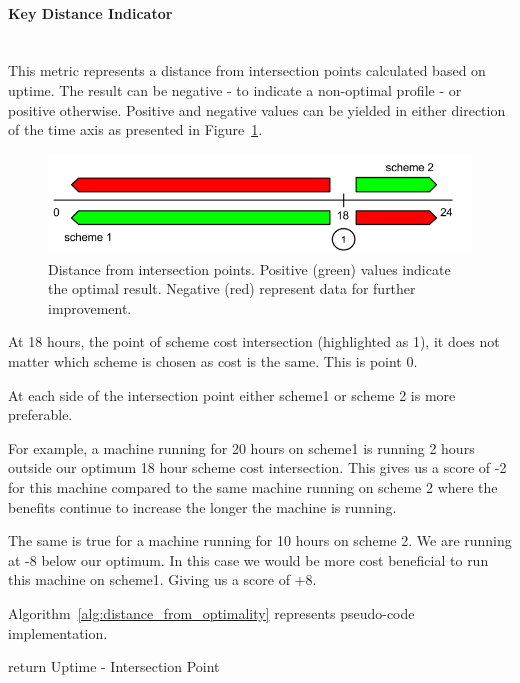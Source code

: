 \documentclass[]{final_report}
\newcommand{\myparagraph}[1]{\paragraph{#1}\mbox{}\\}
\begin{document}
\myparagraph{Key Distance Indicator}

This metric represents a distance from intersection points calculated based on uptime. The result can be negative - to indicate a non-optimal profile - or positive otherwise. Positive and negative values can be yielded in either direction of the time axis as presented in Figure~\ref{fig:distance}. 

\begin{figure}[H]
       \includegraphics[width=\linewidth]{figures/distance}
      \caption{Distance from intersection points. Positive (green) values indicate the optimal result. Negative (red) represent data for further improvement.}
        \label{fig:distance}
\end{figure}

At 18 hours, the point of scheme cost intersection (highlighted as 1), it does not matter which scheme is chosen as cost is the same. This is point 0.

At each side of the intersection point either scheme1 or scheme 2 is more preferable.

For example, a machine running for 20 hours on scheme1 is running 2 hours outside our optimum 18 hour scheme cost intersection. This gives us a score of -2 for this machine compared to the same machine running on scheme 2 where the benefits continue to increase the longer the machine is running.

The same is true for a machine running for 10 hours on scheme 2. We are running at -8 below our optimum. In this case we would be more cost beneficial to run this machine on scheme1. Giving us a score of +8.

Algorithm~\ref{alg:distance_from_optimality} represents pseudo-code implementation.


\begin{algorithm}[H]
 \label{alg:distance_from_optimality}
   {
        return Uptime - Intersection Point
  } 
\caption{Uptime Based Distance From Intersection Points}
\end{algorithm}
\end{document}
